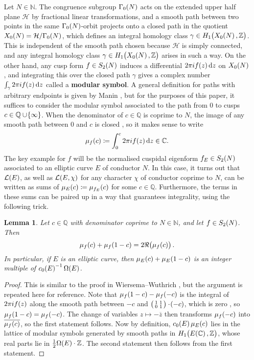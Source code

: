 \documentclass{article}
\theoremstyle{plain}
\newtheorem{lemma}[n]{Lemma}
\theoremstyle{definition}
\newcommand{\CC}{\mathbb{C}}
\renewcommand{\d}{\dif}
\newcommand{\HHH}{\mathcal{H}}
\newcommand{\LLL}{\mathcal{L}}
\newcommand{\NN}{\mathbb{N}}
\newcommand{\QQ}{\mathbb{Q}}
\newcommand{\ZZ}{\mathbb{Z}}
\newcommand{\br}{\!\del}
\newcommand{\twobytwosmall}[4]{\begin{psmallmatrix} #1 & #2 \\ #3 & #4 \end{psmallmatrix}}
\begin{document}
Let $ N \in \NN $. The congruence subgroup $ \Gamma_0\br{N} $ acts on the extended upper half plane $ \HHH $ by fractional linear transformations, and a smooth path between two points in the same $ \Gamma_0\br{N} $-orbit projects onto a closed path in the quotient $ X_0\br{N} = \HHH / \Gamma_0\br{N} $, which defines an integral homology class $ \gamma \in H_1\br{X_0\br{N}, \ZZ} $. This is independent of the smooth path chosen because $ \HHH $ is simply connected, and any integral homology class $ \gamma \in H_1\br{X_0\br{N}, \ZZ} $ arises in such a way. On the other hand, any cusp form $ f \in S_2\br{N} $ induces a differential $ 2\pi if\br{z}\d z $ on $ X_0\br{N} $, and integrating this over the closed path $ \gamma $ gives a complex number $ \int_\gamma 2\pi if\br{z}\d z $ called a \textbf{modular symbol}. A general definition for paths with arbitrary endpoints is given by Manin \cite[Section 1.2]{Man72}, but for the purposes of this paper, it suffices to consider the modular symbol associated to the path from $ 0 $ to cusps $ c \in \QQ \cup \cbr{\infty} $. When the denominator of $ c \in \QQ $ is coprime to $ N $, the image of any smooth path between $ 0 $ and $ c $ is closed \cite[Proposition 2.2]{Man72}, so it makes sense to write
$$ \mu_f\br{c} \coloneqq \int_0^c 2\pi if\br{z}\d z \in \CC. $$
The key example for $ f $ will be the normalised cuspidal eigenform $ f_E \in S_2\br{N} $ associated to an elliptic curve $ E $ of conductor $ N $. In this case, it turns out that $ \LLL\br{E} $, as well as $ \LLL\br{E, \chi} $ for any character $ \chi $ of conductor coprime to $ N $, can be written as sums of $ \mu_E\br{c} \coloneqq \mu_{f_E}\br{c} $ for some $ c \in \QQ $. Furthermore, the terms in these sums can be paired up in a way that guarantees integrality, using the following trick.

\begin{lemma}
\label{lem:modular}
Let $ c \in \QQ $ with denominator coprime to $ N \in \NN $, and let $ f \in S_2\br{N} $. Then
$$ \mu_f\br{c} + \mu_f\br{1 - c} = 2\Re\br{\mu_f\br{c}}. $$
In particular, if $ E $ is an elliptic curve, then $ \mu_E\br{c} + \mu_E\br{1 - c} $ is an integer multiple of $ c_0\br{E}^{-1}\Omega\br{E} $.
\end{lemma}

\begin{proof}
This is similar to the proof in Wiersema--Wuthrich \cite[Lemma 4]{WW22}, but the argument is repeated here for reference. Note that $ \mu_f\br{1 - c} - \mu_f\br{-c} $ is the integral of $ 2\pi if\br{z} $ along the smooth path between $ -c $ and $ \twobytwosmall{1}{1}{0}{1} \cdot \br{-c} $, which is zero \cite[Proposition 1.4]{Man72}, so $ \mu_f\br{1 - c} = \mu_f\br{-c} $. The change of variables $ z \mapsto -\overline{z} $ then transforms $ \mu_f\br{-c} $ into $ \overline{\mu_f\br{c}} $, so the first statement follows. Now by definition, $ c_0\br{E}\mu_E\br{c} $ lies in the lattice of modular symbols generated by smooth paths in $ H_1\br{E\br{\CC}, \ZZ} $, whose real parts lie in $ \tfrac{1}{2}\Omega\br{E} \cdot \ZZ $. The second statement then follows from the first statement.
\end{proof}
\end{document}

